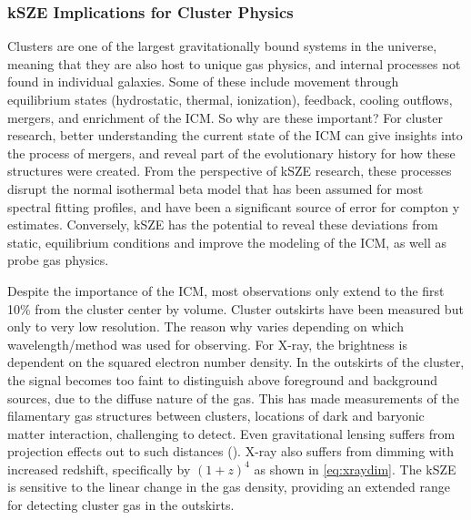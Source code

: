 \documentclass[manuscript]{aastex}
\begin{document}


	
\subsubsection{kSZE Implications for Cluster Physics}

Clusters are one of the largest gravitationally bound systems in the universe, meaning that they are also host to unique gas physics, and internal processes not found in individual galaxies. Some of these include movement through equilibrium states (hydrostatic, thermal, ionization), feedback, cooling outflows, mergers, and enrichment of the ICM. So why are these important? For cluster research, better understanding the current state of the ICM can give insights into the process of mergers, and reveal part of the evolutionary history for how these structures were created. From the perspective of kSZE research, these processes disrupt the normal isothermal beta model that has been assumed for most spectral fitting profiles, and have been a significant source of error for compton y estimates. Conversely, kSZE has the potential to reveal these deviations from static, equilibrium conditions and improve the modeling of the ICM, as well as probe gas physics. 

Despite the importance of the ICM, most observations only extend to the first 10\% from the cluster center by volume. Cluster outskirts have been measured but only to very low resolution. The reason why varies depending on which wavelength/method was used for observing. For X-ray, the brightness is dependent on the squared electron number density. In the outskirts of the cluster, the signal becomes too faint to distinguish above foreground and background sources, due to the diffuse nature of the gas.  This has made measurements of the filamentary gas structures between clusters, locations of dark and baryonic matter interaction, challenging to detect. Even gravitational lensing suffers from projection effects out to such distances (\cite{Reiprich2013}). X-ray also suffers from dimming with increased redshift, specifically by \((1+z)^{4}\) as shown in \ref{eq:xraydim}. The kSZE is sensitive to the linear change in the gas density, providing an extended range for detecting cluster gas in the outskirts. 
\end{document}
